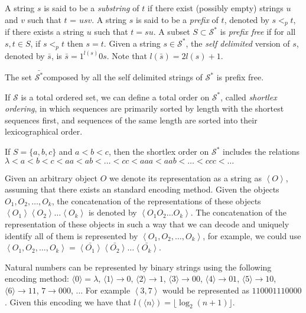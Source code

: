 A string $s$ is said to be a \emph{substring} of $t$ if there exist (possibly empty) strings $u$ and $v$ such that $t$ = $usv$. A string $s$ is said to be a \emph{prefix} of $t$, denoted by $s <_p t$, if there exists a string $u$ such that $t = su$. A subset $S \subset \mathcal{S}^{\ast}$ is \emph{prefix free} if for all $s, t \in S$, if $s <_p t$ then $s = t$. Given a string $s \in \mathcal{S}^{\ast}$, the \emph{self delimited} version of $s$, denoted by $\bar{s}$, is $\bar{s} = 1^{l(s)}0s$. Note that $l(\bar{s}) = 2l(s)+1$.

\begin{example}
The set $\bar{\mathcal{S}^{\ast}}$composed by all the self delimited strings of $\mathcal{S}^{\ast}$ is prefix free.
\end{example}

If $\mathcal{S}$ is a total ordered set, we can define a total order on $\mathcal{S}^{\ast}$, called \emph{shortlex ordering}, in which sequences are primarily sorted by length with the shortest sequences first, and sequences of the same length are sorted into their lexicographical order.

\begin{example}
If $S = \{a, b, c\}$ and $a < b < c$, then the shortlex order on $\mathcal{S}^{\ast}$ includes the relations $\lambda < a < b < c < aa < ab < \ldots < cc < aaa < aab < \ldots < ccc < \ldots$
\end{example}

Given an arbitrary object $O$ we denote its representation as a string as $\left\langle O\right\rangle$, assuming that there exists an standard encoding method. Given the objects $O_{1},O_{2},\ldots,O_{k}$, the concatenation of the representations of these objects $\left\langle O_1 \right\rangle \left\langle O_2 \right\rangle \ldots \left\langle O_k \right\rangle$ is denoted by $\left\langle O_1 O_2 \ldots O_k \right\rangle$. The concatenation of the representation of these objects in such a way that we can decode and uniquely identify all of them is represented by $\left\langle O_1, O_2,\ldots,O_k \right\rangle$, for example, we could use $\left\langle O_1, O_2,\ldots,O_k \right\rangle = \bar{\left\langle O_1 \right\rangle} \bar{\left\langle O_2 \right\rangle} \ldots \bar{\left\langle O_k \right\rangle}$.

\begin{example}
Natural numbers can be represented by binary strings using the following encoding method: $\langle 0 \rangle = \lambda$, $\langle 1 \rangle \rightarrow 0$, $\langle 2 \rangle \rightarrow 1$, $\langle 3 \rangle \rightarrow 00$, $\langle 4 \rangle \rightarrow 01$, $\langle 5 \rangle \rightarrow 10$, $\langle 6 \rangle \rightarrow 11$, $7 \rightarrow 000$, ... For example $\left\langle 3, 7 \right\rangle$  would be represented as $110001110000$. Given this encoding we have that $l \left( \langle n \rangle \right) = \lfloor \log_2 (n + 1) \rfloor$.
\end{example}

